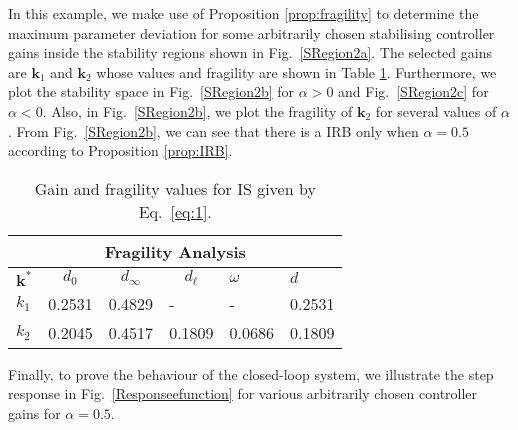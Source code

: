 \documentclass[twoside,reqno,11pt]{fcaa-var} %
\begin{document}
In this example, we make use of Proposition \ref{prop:fragility} to determine the maximum parameter deviation for some arbitrarily chosen stabilising controller gains inside the stability regions shown in Fig.~\ref{SRegion2a}. The selected gains are $\bm{k}_1$ and $\bm{k}_2$ whose values and fragility are shown in Table \ref{table:fragility}. Furthermore, we plot the stability space in Fig.~\ref{SRegion2b} for $\alpha>0$ and Fig.~\ref{SRegion2c} for $\alpha<0$. Also, in Fig.~\ref{SRegion2b}, we plot the fragility of $\bm{k}_2$ for several values of $\alpha$. From Fig.~\ref{SRegion2b}, we can see that there is a IRB only when $\alpha=0.5$ according to Proposition \ref{prop:IRB}.\par 
\begin{table}
	\centering
	\caption{Gain and fragility values for IS given by Eq.~\ref{eq:1}.}\label{table:fragility}
	\begin{adjustbox}{max width=\columnwidth}
		\begin{tabular}{llllll}
			\multicolumn{6}{c}{Fragility Analysis} \\ \hline
			\multicolumn{1}{c}{$\bm{k}^*$} & \multicolumn{1}{c}{$d_0$} & \multicolumn{1}{c}{$d_\infty$} & \multicolumn{1}{c}{$d_\ell$} & $\omega$ & $d$ \\ \hline
			$k_1$ & 0.2531 & 0.4829 & - & - & 0.2531 \\
			$k_2$ & 0.2045 & 0.4517 & 0.1809 & 0.0686 & 0.1809
		\end{tabular}
	\end{adjustbox}
	
\end{table}
Finally, to prove the behaviour of the closed-loop system, we illustrate the step response in Fig.~\ref{Responseefunction} for various arbitrarily chosen controller gains for $\alpha=0.5$.
\end{document}
